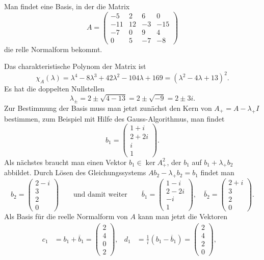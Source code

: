 Man findet eine Basis, in der die Matrix
\[
A=\begin{pmatrix}
 -5&  2&  6&   0\\
-11& 12& -3& -15\\
 -7&  0&  9&   4\\
  0&  5& -7&  -8
\end{pmatrix}
\]
die relle Normalform bekommt.

\begin{loesung}
Das charakteristische Polynom der Matrix ist 
\[
\chi_{A}(\lambda)
=
\lambda^4-8\lambda^3+42\lambda^2-104\lambda+169
=
(\lambda^2-4\lambda+13)^2.
\]
Es hat die doppelten Nullstellen
\[
\lambda_\pm
=
2\pm \sqrt{4-13}
=
2\pm \sqrt{-9}
=
2\pm 3i.
\]
Zur Bestimmung der Basis muss man jetzt zunächst den Kern von 
$A_+=A-\lambda_+I$ bestimmen, zum Beispiel mit Hilfe des Gauss-Algorithmus,
man findet
\[
b_1
=
\begin{pmatrix}
1+i\\
2+2i\\
i\\
1
\end{pmatrix}.
\]
Als nächstes braucht man einen Vektor $b_1\in \ker A_+^2$, der 
$b_1$ auf $b_1+\lambda_+b_2$ abbildet.
Durch Lösen des Gleichungssystems $Ab_2-\lambda_+ b_2=b_1$ findet man
\[
b_2
=
\begin{pmatrix}
2-i\\3\\2\\0
\end{pmatrix}
\qquad\text{und damit weiter}\qquad
\overline{b}_1
=
\begin{pmatrix}
1-i\\
2-2i\\
-i\\
1
\end{pmatrix},\quad
\overline{b}_2
=
\begin{pmatrix}
2+i\\3\\2\\0
\end{pmatrix}.
\]
Als Basis für die reelle Normalform von $A$ kann man jetzt die Vektoren
\begin{align*}
c_1
&=
b_1+\overline{b}_1 = \begin{pmatrix}2\\4\\0\\2\end{pmatrix},&
d_1
&=
\frac{1}{i}(b_1-\overline{b}_1) = \begin{pmatrix}2\\4\\2\\0\end{pmatrix},&

\end{align*}
\end{loesung}
